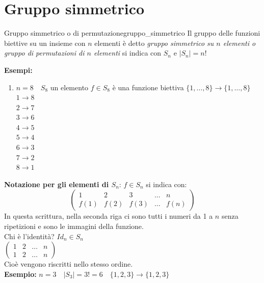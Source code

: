 \documentclass[12pt, letterpaper]{report}
\newcounter{definition}
\newcommand{\nmu}{}
\begin{document}
		\section{Gruppo simmetrico}
		\begin{definition}{\nmu Gruppo simmetrico o di permutazione}{gruppo_simmetrico}
			Il gruppo delle funzioni biettive su un insieme con $n$ elementi è detto \textit{gruppo simmetrico su $n$ elementi o gruppo di permutazioni di $n$ elementi} si indica con $S_n$ e $|S_n| = n!$
		\end{definition}
		\textbf{Esempi:}
		\begin{enumerate}
			\item $n = 8 \quad S_8$ un elemento $f \in S_8$ è una funzione biettiva $\{1, \dots, 8\} \to \{1, \dots, 8\}$ \\
			$1 \to 8$ \\
			$2 \to 7$ \\
			$3 \to 6$ \\
			$4 \to 5$ \\
			$5 \to 4$ \\
			$6 \to 3$ \\
			$7 \to 2$ \\
			$8 \to 1$ \\
		\end{enumerate}
		\textbf{\color{red} Notazione per gli elementi di $S_n$}: $f \in S_n$ si indica con: \\
		\[
		\begin{pmatrix}
			1 & 2 & 3 & \dots & n \\
			f(1) & f(2) & f(3) & \dots & f(n)
		\end{pmatrix}
		\]
		In questa scrittura, nella seconda riga ci sono tutti i numeri da 1 a $n$ senza ripetizioni e sono le immagini della funzione. \\
		Chi è l'identità? $Id_n \in S_n$ \\
		$\begin{pmatrix}
			1 & 2 & \dots & n \\
			1 & 2 & \dots & n
		\end{pmatrix}$ \\
		Cioè vengono riscritti nello stesso ordine. \\
		\textbf{Esempio:} $n = 3 \quad |S_3| = 3! = 6 \quad \{1,2,3\} \to \{1,2,3\}$ \\
\end{document}
